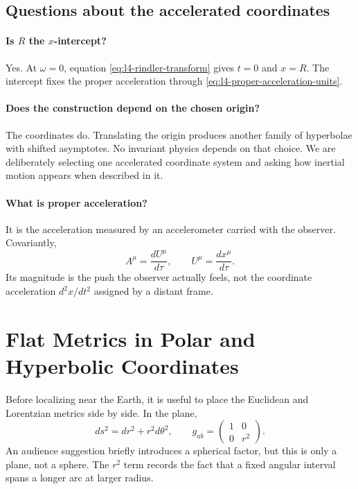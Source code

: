 \subsection{Questions about the accelerated coordinates}

\paragraph{Is \(R\) the \(x\)-intercept?}
Yes. At \(\omega=0\), equation \eqref{eq:l4-rindler-transform} gives \(t=0\) and \(x=R\). The intercept fixes the proper acceleration through \eqref{eq:l4-proper-acceleration-units}.

\paragraph{Does the construction depend on the chosen origin?}
The coordinates do. Translating the origin produces another family of hyperbolae with shifted asymptotes. No invariant physics depends on that choice. We are deliberately selecting one accelerated coordinate system and asking how inertial motion appears when described in it.

\paragraph{What is proper acceleration?}
It is the acceleration measured by an accelerometer carried with the observer. Covariantly,
\begin{equation}
A^\mu=\frac{dU^\mu}{d\tau},
\qquad
U^\mu=\frac{dx^\mu}{d\tau}.
\end{equation}
Its magnitude is the push the observer actually feels, not the coordinate acceleration \(d^2x/dt^2\) assigned by a distant frame.

\section{Flat Metrics in Polar and Hyperbolic Coordinates}

Before localizing near the Earth, it is useful to place the Euclidean and Lorentzian metrics side by side. In the plane,
\begin{equation}
ds^2=dr^2+r^2d\theta^2,
\qquad
g_{ab}
=
\begin{pmatrix}
1&0\\
0&r^2
\end{pmatrix}.
\label{eq:l4-polar-metric}
\end{equation}
An audience suggestion briefly introduces a spherical factor, but this is only a plane, not a sphere. The \(r^2\) term records the fact that a fixed angular interval spans a longer arc at larger radius.


